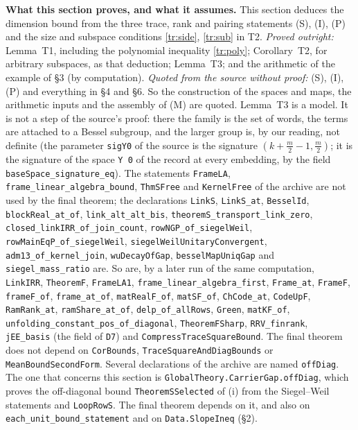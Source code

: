 \documentclass[11pt,letterpaper]{article}
\begin{document}
\textbf{What this section proves, and what it assumes.} This section deduces the dimension bound from
the three trace, rank and pairing statements (S), (I), (P) and the size and subspace conditions
\eqref{tr:side}, \eqref{tr:sub} in T2. \emph{Proved outright:} Lemma~T1, including the
polynomial inequality \eqref{tr:poly}; Corollary~T2, for arbitrary subspaces, as that deduction; Lemma~T3;
and the arithmetic of the example of \S3 (by computation). \emph{Quoted from the
source without proof:} (S), (I), (P) and everything in \S4 and \S6. So the construction of the spaces and
maps, the arithmetic inputs and the assembly of (M) are quoted. Lemma~T3 is a model. It is not a step of
the source's proof: there the family is the set of words, the terms are attached to a Bessel subgroup, and
the larger group is, by our reading, not definite (the parameter \texttt{sigY0} of the source is the
signature $(k+\frac m2-1,\frac m2)$; it is the signature of the space \texttt{Y 0} of the record at every
embedding, by the field \texttt{baseSpace\_signature\_eq}). The statements \texttt{FrameLA}, \texttt{frame\_linear\_algebra\_bound},
\texttt{ThmSFree} and \texttt{KernelFree} of the archive are not used by the final theorem; the declarations
\texttt{LinkS}, \texttt{LinkS\_at}, \texttt{BesselId}, \texttt{blockReal\_at\_of}, \texttt{link\_alt\_alt\_bis},
\texttt{theoremS\_transport\_link\_zero}, \texttt{closed\_linkIRR\_of\_join\_count}, \texttt{rowNGP\_of\_siegelWeil},
\texttt{rowMainEqP\_of\_siegelWeil}, \texttt{siegelWeilUnitaryConvergent}, \texttt{adm13\_of\_kernel\_join},
\texttt{wuDecayOfGap}, \texttt{besselMapUniqGap} and \texttt{siegel\_mass\_ratio} are. So are, by a later
run of the same computation, \texttt{LinkIRR}, \texttt{TheoremF}, \texttt{FrameLA1},
\texttt{frame\_linear\_algebra\_first}, \texttt{Frame\_at}, \texttt{FrameF}, \texttt{frameF\_of},
\texttt{frame\_at\_of}, \texttt{matRealF\_of}, \texttt{matSF\_of}, \texttt{ChCode\_at}, \texttt{CodeUpF},
\texttt{RamRank\_at}, \texttt{ramShare\_at\_of}, \texttt{delp\_of\_allRows}, \texttt{Green},
\texttt{matKF\_of}, \texttt{unfolding\_constant\_pos\_of\_diagonal}, \texttt{TheoremFSharp},
\texttt{RRV\_finrank}, \texttt{jEE\_basis} (the field of \texttt{D7}) and
\texttt{CompressTraceSquareBound}. The final theorem does not depend on \texttt{CorBounds},
\texttt{TraceSquareAndDiagBounds} or \texttt{MeanBoundSecondForm}. Several declarations of the archive are named \texttt{offDiag}. The one that concerns this
section is \texttt{GlobalTheory.CarrierGap.offDiag}, which proves the off-diagonal bound
\texttt{TheoremSSelected} of (i) from the Siegel--Weil statements and \texttt{LoopRowS}. The final theorem
depends on it, and also on \texttt{each\_unit\_bound\_statement} and on \texttt{Data.SlopeIneq} (\S2).
\end{document}
